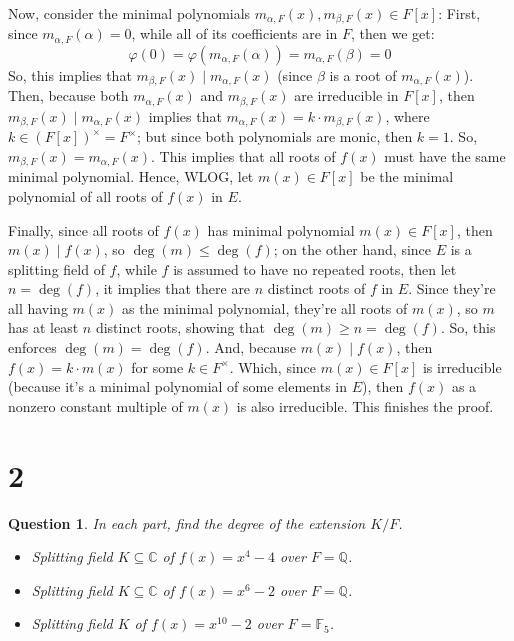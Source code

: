 \documentclass{article}
\newtheorem{question}{Question}
\begin{document}
\begin{itemize}
    Now, consider the minimal polynomials $m_{\alpha,F}(x),m_{\beta,F}(x)\in F[x]$: First, since $m_{\alpha,F}(\alpha)=0$, while all of its coefficients are in $F$, then we get:
    $$\varphi(0)=\varphi(m_{\alpha,F}(\alpha)) = m_{\alpha,F}(\beta) = 0$$
    So, this implies that $m_{\beta,F}(x)\mid m_{\alpha,F}(x)$ (since $\beta$ is a root of $m_{\alpha,F}(x)$). Then, because both $m_{\alpha,F}(x)$ and $m_{\beta,F}(x)$ are irreducible in $F[x]$, then $m_{\beta,F}(x)\mid m_{\alpha,F}(x)$ implies that $m_{\alpha,F}(x)=k\cdot m_{\beta,F}(x)$, where $k\in (F[x])^\times = F^\times$; but since both polynomials are monic, then $k=1$. So, $m_{\beta,F}(x)=m_{\alpha,F}(x)$. This implies that all roots of $f(x)$ must have the same minimal polynomial. Hence, WLOG, let $m(x)\in F[x]$ be the minimal polynomial of all roots of $f(x)$ in $E$.

    Finally, since all roots of $f(x)$ has minimal polynomial $m(x)\in F[x]$, then $m(x)\mid f(x)$, so $\deg(m)\leq \deg(f)$; on the other hand, since $E$ is a splitting field of $f$, while $f$ is assumed to have no repeated roots, then let $n=\deg(f)$, it implies that there are $n$ distinct roots of $f$ in $E$. Since they're all having $m(x)$ as the minimal polynomial, they're all roots of $m(x)$, so $m$ has at least $n$ distinct roots, showing that $\deg(m)\geq n = \deg(f)$.
    So, this enforces $\deg(m)=\deg(f)$. And, because $m(x)\mid f(x)$, then $f(x)=k\cdot m(x)$ for some $k\in F^\times$. Which, since $m(x)\in F[x]$ is irreducible (because it's a minimal polynomial of some elements in $E$), then $f(x)$ as a nonzero constant multiple of $m(x)$ is also irreducible. This finishes the proof.
\end{itemize}

\break

\section*{2}
\begin{myBox}[]{}
    \begin{question}
        In each part, find the degree of the extension $K/F$.
        \begin{itemize}
            \item[(a)] Splitting field $K\subseteq\mathbb{C}$ of $f(x)=x^4-4$ over $F=\mathbb{Q}$.
            \item[(b)] Splitting field $K\subseteq\mathbb{C}$ of $f(x)=x^6-2$ over $F=\mathbb{Q}$.
            \item[(c)] Splitting field $K$ of $f(x)=x^{10}-2$ over $F=\mathbb{F}_5$.  
        \end{itemize}
    \end{question}
\end{myBox}
\end{document}
